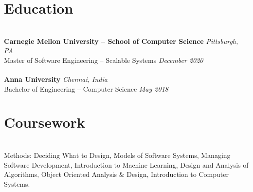 \documentclass{resume}
\author{https://aravindvasu.dev}{Aravind Vasudevan}
\begin{document}
\maketitle
\section*{Education}
\titlerule
\noindent
\\
\textbf{Carnegie Mellon University -- School of Computer Science} \hfill \textit{Pittsburgh, PA} \\
{\small Master of Software Engineering -- Scalable Systems} \hfill \textit{\small December 2020}\\
\\
\textbf{Anna University} \hfill \textit{Chennai, India} \\
{\small Bachelor of Engineering -- Computer Science} \hfill \textit{\small May 2018}

\section*{Coursework}
\titlerule
\noindent
\\
Methods: Deciding What to Design, Models of Software Systems, Managing Software Development, Introduction to Machine Learning, Design and Analysis of Algorithms, Object Oriented Analysis \& Design, Introduction to Computer Systems.
\end{document}
